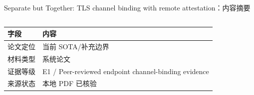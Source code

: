 \begin{frame}[t,shrink=6]{Separate but Together: TLS channel binding with remote attestation：内容摘要}
\begin{columns}[T,totalwidth=\textwidth]
\begin{column}{0.49\textwidth}
{\begin{minipage}[t]{0.97\linewidth}
    \vspace{1.1mm}
    \hspace{1.4mm}\begin{minipage}{0.92\linewidth}
      \scriptsize {\tiny
\begin{tabularx}{\linewidth}{@{}YY@{}}
\toprule
\textbf{字段} & \textbf{内容} \\
\midrule
论文定位 & 当前 SOTA/补充边界 \\
材料类型 & 系统论文 \\
证据等级 & E1 / Peer-reviewed endpoint channel-binding evidence \\
来源状态 & 本地 PDF 已核验 \\
\bottomrule
\end{tabularx}
}
    \end{minipage}
    \vspace{1mm}
  \end{minipage}}
  \end{column}
\end{columns}
\end{frame}


